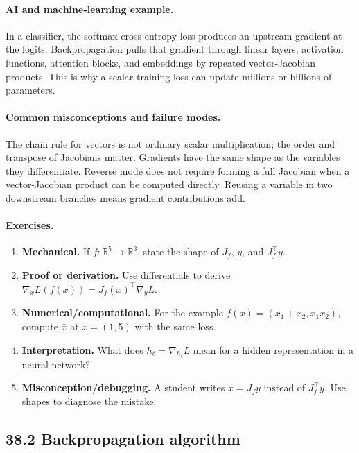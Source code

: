 \paragraph{AI and machine-learning example.}
In a classifier, the softmax-cross-entropy loss produces an upstream gradient at the logits. Backpropagation pulls that gradient through linear layers, activation functions, attention blocks, and embeddings by repeated vector-Jacobian products. This is why a scalar training loss can update millions or billions of parameters.

\paragraph{Common misconceptions and failure modes.}
The chain rule for vectors is not ordinary scalar multiplication; the order and transpose of Jacobians matter. Gradients have the same shape as the variables they differentiate. Reverse mode does not require forming a full Jacobian when a vector-Jacobian product can be computed directly. Reusing a variable in two downstream branches means gradient contributions add.

\paragraph{Exercises.}
\begin{enumerate}[label=\textbf{38.1.\arabic*.}, leftmargin=*]
\item \textbf{Mechanical.} If \(f:\mathbb R^5\to\mathbb R^3\), state the shape of \(J_f\), \(\bar y\), and \(J_f^\top\bar y\).
\item \textbf{Proof or derivation.} Use differentials to derive \(\nabla_x L(f(x))=J_f(x)^\top\nabla_y L\).
\item \textbf{Numerical/computational.} For the example \(f(x)=(x_1+x_2,x_1x_2)\), compute \(\bar x\) at \(x=(1,5)\) with the same loss.
\item \textbf{Interpretation.} What does \(\bar h_\ell=\nabla_{h_\ell}L\) mean for a hidden representation in a neural network?
\item \textbf{Misconception/debugging.} A student writes \(\bar x=J_f\bar y\) instead of \(J_f^\top\bar y\). Use shapes to diagnose the mistake.
\end{enumerate}

\subsection{38.2 Backpropagation algorithm}

